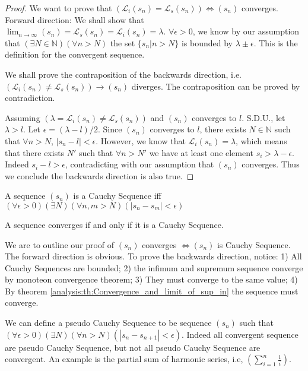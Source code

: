 \documentclass[../note.tex]{subfiles}
\begin{document}
\begin{proof}
We want to prove that $(\mathcal{L}_i (s_n) = \mathcal{L}_s (s_n)) \iff (s_n)$ converges. \\
Forward direction: We shall show that $\lim_{n\to \infty}(s_n)=\mathcal{L}_s(s_n) = \mathcal{L}_i (s_n) = \lambda$. $\forall \epsilon >0$, we know by our assumption that $(\exists N \in \mathbb{N})(\forall n>N)$ the set $\{s_n|n>N\}$ is bounded by $\lambda \pm \epsilon.$ This is the definition for the convergent sequence. 

We shall prove the contraposition of the backwards direction, i.e. $ (\mathcal{L}_i (s_n) \neq \mathcal{L}_s (s_n)) \rightarrow (s_n)$ diverges.
The contraposition can be proved by contradiction. 

Assuming $ (\lambda = \mathcal{L}_i (s_n) \neq \mathcal{L}_s (s_n))$ and $ (s_n)$ converges to $l$. S.D.U., let $\lambda > l$. 
Let $\epsilon = (\lambda - l)/2$. 
Since $(s_n)$ converges to $l$, there exists $N \in \mathbb{N}$ such that $\forall n>N$, $|s_n - l| < \epsilon$. 
However, we know that $\mathcal{L}_i (s_n) = \lambda$, which means that there exists $N'$ such that $\forall n>N'$ we have at least one element $s_i > \lambda - \epsilon$. Indeed $s_i - l>\epsilon$, contradicting with our assumption that $(s_n)$ converges. Thus we conclude the backwards direction is also true.
\end{proof}

\begin{definition}\cite{Ross}
	A sequence $(s_n)$ is a Cauchy Sequence iff $(\forall \epsilon > 0)(\exists N)(\forall n,m>N)(|s_n-s_m|<\epsilon)$
\end{definition}
\begin{theorem}
A sequence converges if and only if it is a Cauchy Sequence. 
\end{theorem}
\begin{remark}
We are to outline our proof of $(s_n)$ converges $\iff (s_n)$ is Cauchy Sequence. \\
The forward direction is obvious. To prove the backwards direction, notice: 1) All Cauchy Sequences are bounded; 2) the infimum and supremum sequence converge by monoteon convergence theorem; 3) They must converge to the same value;
4) By theorem \ref{analysis:th:Convergence_and_limit_of_sup_in} the sequence must converge. 
\end{remark}
\begin{remark}
	We can define a pseudo Cauchy Sequence to be sequence $(s_n)$ such that $(\forall \epsilon > 0)(\exists N)(\forall n>N)(|s_n-s_{n+1}|<\epsilon)$.
	Indeed all convergent sequence are pseudo Cauchy Sequence, but not all pseudo Cauchy Sequence are convergent. An example is the partial sum of harmonic series, i.e, $(\sum^{n}_{i=1}\frac{1}{i})$.
\end{remark}
\end{document}
